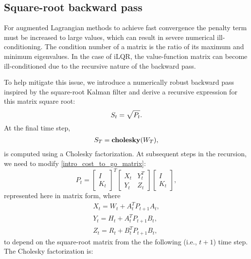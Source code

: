 \subsection{Square-root backward pass}
For augmented Lagrangian methods to achieve fast convergence the penalty term must be increased to large values, which can result in severe numerical ill-conditioning. The condition number of a matrix is the ratio of its maximum and minimum eigenvalues. In the case of iLQR, the value-function matrix can become ill-conditioned due to the recursive nature of the backward pass.

To help mitigate this issue, we introduce a numerically robust backward pass inspired by the square-root Kalman filter \cite{kaminski1971discrete} and derive a recursive expression for this matrix square root: 
\begin{equation}
	S_t = \sqrt{P_t}. \\
\end{equation}
At the final time step,
\begin{align}
	S_T = \mbox{\textbf{cholesky}}(W_T),
\end{align}
is computed using a Cholesky factorization. At subsequent steps in the recursion, we need to modify \eqref{intro_cost_to_go_matrix}:
\begin{equation}
P_t = \begin{bmatrix} I \\ K_t \end{bmatrix}^T 
	  \begin{bmatrix} X_t & Y_t^T \\ Y_t & Z_t \end{bmatrix}
	  \begin{bmatrix} I \\ K_t \end{bmatrix},
\end{equation}
represented here in matrix form, where 
\begin{align}
	X_t = W_t + A_t^T P_{t+1} A_t, \\
	Y_t = H_t + A_t^T P_{t+1} B_t, \\
	Z_t = R_t + B_t^T P_{t+1} B_t,
\end{align}
to depend on the square-root matrix from the the following (i.e., $t+1$) time step. The Cholesky factorization is:
